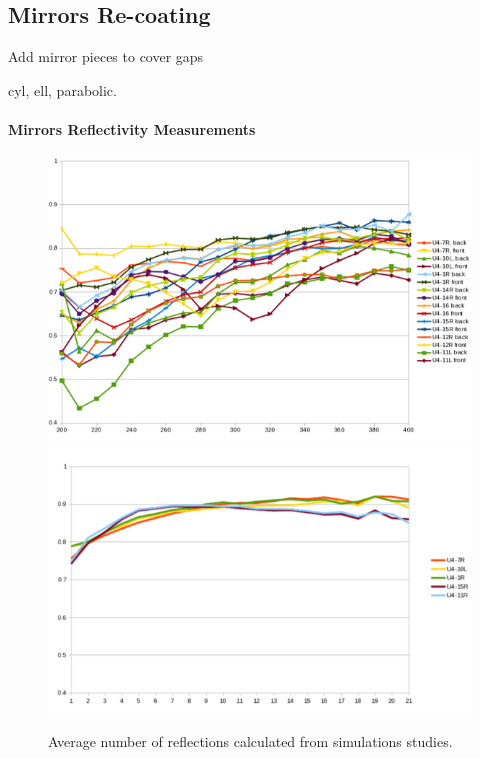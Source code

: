 \subsection{Mirrors Re-coating}


Add mirror pieces to cover gaps





cyl, ell, parabolic.




\paragraph{Mirrors Reflectivity Measurements}

\begin{figure}[hbt]
\centering
	\includegraphics[width=1.0\columnwidth,keepaspectratio]{img/mirrorsReflectivityBefore.png}
	\includegraphics[width=1.0\columnwidth,keepaspectratio]{img/mirrorsReflectivityAfter.png}
	\caption{Average number of reflections calculated from simulations studies.}
	\label{fig:reflectivityFixed}
\end{figure}



